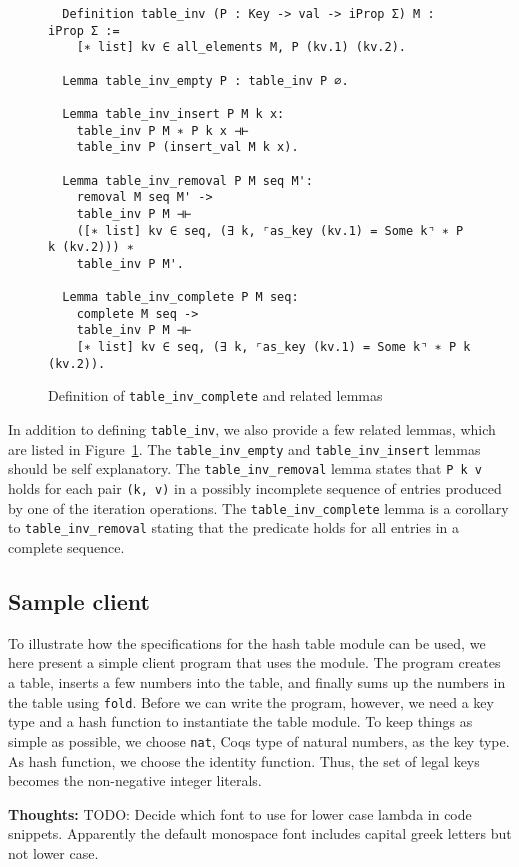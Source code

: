 \documentclass[10pt,a4paper]{article}
\renewcommand{\fcolorbox}[4][]{#4}}
\newcommand{\thoughts}[1]{\noindent\fcolorbox{black}{cyan}{\parbox{\textwidth}{\textbf{Thoughts:} \linebreak #1}}}
\begin{document}
\begin{figure}
\begin{verbatim}
  Definition table_inv (P : Key -> val -> iProp Σ) M : iProp Σ :=
    [∗ list] kv ∈ all_elements M, P (kv.1) (kv.2).

  Lemma table_inv_empty P : table_inv P ∅.
  
  Lemma table_inv_insert P M k x:
    table_inv P M ∗ P k x ⊣⊢
    table_inv P (insert_val M k x).
      
  Lemma table_inv_removal P M seq M':
    removal M seq M' ->
    table_inv P M ⊣⊢
    ([∗ list] kv ∈ seq, (∃ k, ⌜as_key (kv.1) = Some k⌝ ∗ P k (kv.2))) ∗
    table_inv P M'.
    
  Lemma table_inv_complete P M seq:
    complete M seq ->
    table_inv P M ⊣⊢
    [∗ list] kv ∈ seq, (∃ k, ⌜as_key (kv.1) = Some k⌝ ∗ P k (kv.2)).    
\end{verbatim}
\caption{Definition of \texttt{table\_inv\_complete} and related lemmas}
\label{fig:table_inv}
\end{figure}

In addition to defining \texttt{table\_inv}, we also provide a few related lemmas, which are listed in Figure~\ref{fig:table_inv}. The \texttt{table\_inv\_empty} and \texttt{table\_inv\_insert} lemmas should be self explanatory. The \texttt{table\_inv\_removal} lemma states that \texttt{P k v} holds for each pair \texttt{(k, v)} in a possibly incomplete sequence of entries produced by one of the iteration operations. The \texttt{table\_inv\_complete} lemma is a corollary to \texttt{table\_inv\_removal} stating that the predicate holds for all entries in a complete sequence.

\subsection{Sample client}
To illustrate how the specifications for the hash table module can be used, we here present a simple client program that uses the module. The program creates a table, inserts a few numbers into the table, and finally sums up the numbers in the table using \texttt{fold}. Before we can write the program, however, we need a key type and a hash function to instantiate the table module. To keep things as simple as possible, we choose \texttt{nat}, Coqs type of natural numbers, as the key type. As hash function, we choose the identity function. Thus, the set of legal keys becomes the non-negative integer literals.

\thoughts{TODO: Decide which font to use for lower case lambda in code snippets. Apparently the default monospace font includes capital greek letters but not lower case.}
\end{document}
